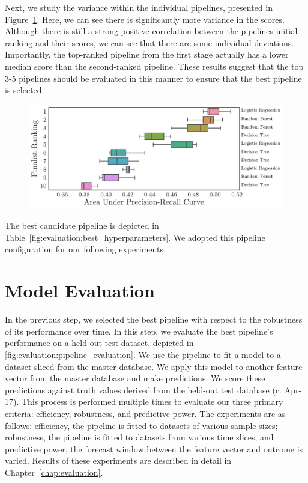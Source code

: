 \documentclass[../thesis/thesis.tex]{subfiles}
\begin{document}
Next, we study the variance within the individual pipelines, presented in Figure~\ref{fig:evaluation:selection_agg_rank}. Here, we can see there is significantly more variance in the scores. Although there is still a strong positive correlation between the pipelines initial ranking and their scores, we can see that there are some individual deviations. Importantly, the top-ranked pipeline from the first stage actually has a lower median score than the second-ranked pipeline. These results suggest that the top 3-5 pipelines should be evaluated in this manner to ensure that the best pipeline is selected.

\begin{figure}[!htb]
    \centering
    \includegraphics[width=\textwidth]{../figures/evaluation/selection_agg_rank}
    \caption[Overview of finalist pipeline performance]{}
    \label{fig:evaluation:selection_agg_rank}
\end{figure}

The best candidate pipeline is depicted in Table~\ref{fig:evaluation:best_hyperparameters}. We adopted this pipeline configuration for our following experiments.

\begin{table}[!htb]
    \centering
    \scalebox{0.8}{}
    \caption[Hyperparameters of best pipeline]{}
    \label{fig:evaluation:best_hyperparameters}
\end{table}

\section{Model Evaluation}

In the previous step, we selected the best pipeline with respect to the robustness of its performance over time. In this step, we evaluate the best pipeline's performance on a held-out test dataset, depicted in \ref{fig:evaluation:pipeline_evaluation}. We use the pipeline to fit a model to a dataset sliced from the master database. We apply this model to another feature vector from the master database and make predictions. We score these predictions against truth values derived from the held-out test database (c. Apr-17). This process is performed multiple times to evaluate our three primary criteria: efficiency, robustness, and predictive power. The experiments are as follows: efficiency, the pipeline is fitted to datasets of various sample sizes; robustness, the pipeline is fitted to datasets from various time slices; and predictive power, the forecast window between the feature vector and outcome is varied. Results of these experiments are described in detail in Chapter~\ref{chap:evaluation}.
\end{document}
